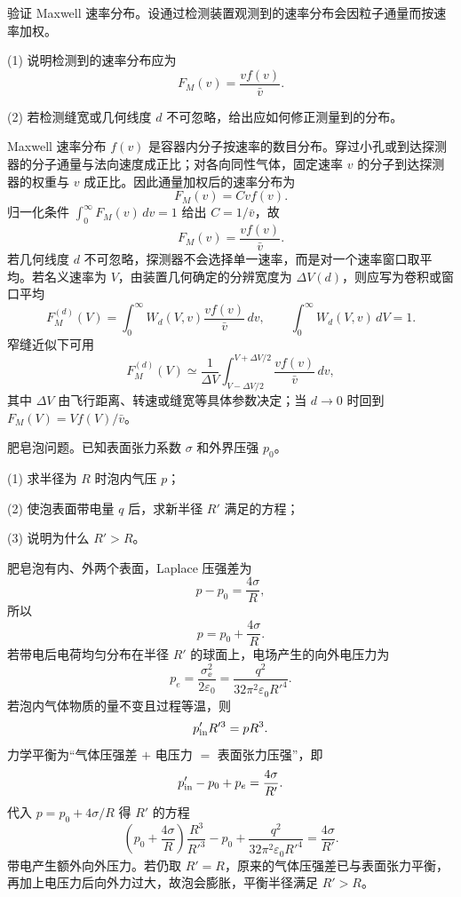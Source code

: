 \begin{question}
验证 Maxwell 速率分布。设通过检测装置观测到的速率分布会因粒子通量而按速率加权。

(1) 说明检测到的速率分布应为
\[
F_M(v)=\frac{v f(v)}{\bar v}.
\]

(2) 若检测缝宽或几何线度 $d$ 不可忽略，给出应如何修正测量到的分布。
\begin{solution}
Maxwell 速率分布 $f(v)$ 是容器内分子按速率的数目分布。穿过小孔或到达探测器的分子通量与法向速度成正比；对各向同性气体，固定速率 $v$ 的分子到达探测器的权重与 $v$ 成正比。因此通量加权后的速率分布为
\[
F_M(v)=Cvf(v).
\]
归一化条件 $\int_0^\infty F_M(v)\,dv=1$ 给出 $C=1/\bar v$，故
\[
F_M(v)=\frac{v f(v)}{\bar v}.
\]
若几何线度 $d$ 不可忽略，探测器不会选择单一速率，而是对一个速率窗口取平均。若名义速率为 $V$，由装置几何确定的分辨宽度为 $\Delta V(d)$，则应写为卷积或窗口平均
\[
F_M^{(d)}(V)=\int_0^\infty W_d(V,v)\frac{v f(v)}{\bar v}\,dv,
\qquad
\int_0^\infty W_d(V,v)\,dV=1.
\]
窄缝近似下可用
\[
F_M^{(d)}(V)\simeq\frac1{\Delta V}\int_{V-\Delta V/2}^{V+\Delta V/2}\frac{v f(v)}{\bar v}\,dv,
\]
其中 $\Delta V$ 由飞行距离、转速或缝宽等具体参数决定；当 $d\to0$ 时回到 $F_M(V)=Vf(V)/\bar v$。
\end{solution}
\end{question}

\begin{question}
肥皂泡问题。已知表面张力系数 $\sigma$ 和外界压强 $p_0$。

(1) 求半径为 $R$ 时泡内气压 $p$；

(2) 使泡表面带电量 $q$ 后，求新半径 $R'$ 满足的方程；

(3) 说明为什么 $R'>R$。
\begin{solution}
肥皂泡有内、外两个表面，Laplace 压强差为
\[
p-p_0=\frac{4\sigma}{R},
\]
所以
\[
p=p_0+\frac{4\sigma}{R}.
\]
若带电后电荷均匀分布在半径 $R'$ 的球面上，电场产生的向外电压力为
\[
p_e=\frac{\sigma_\ee^{2}}{2\varepsilon_0}
=\frac{q^2}{32\pi^2\varepsilon_0 R'^4}.
\]
若泡内气体物质的量不变且过程等温，则
\[
p_{\rm in}'R'^3=pR^3.
\]
力学平衡为“气体压强差 $+$ 电压力 $=$ 表面张力压强”，即
\[
p_{\rm in}'-p_0+p_e=\frac{4\sigma}{R'}.
\]
代入 $p=p_0+4\sigma/R$ 得 $R'$ 的方程
\[
\left(p_0+\frac{4\sigma}{R}\right)\frac{R^3}{R'^3}-p_0
+\frac{q^2}{32\pi^2\varepsilon_0R'^4}
=\frac{4\sigma}{R'}.
\]
带电产生额外向外压力。若仍取 $R'=R$，原来的气体压强差已与表面张力平衡，再加上电压力后向外力过大，故泡会膨胀，平衡半径满足 $R'>R$。
\end{solution}
\end{question}

